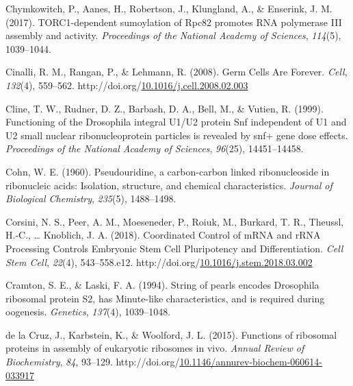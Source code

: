 \documentclass[12pt,oneside]{reedthesis}
\newlength{\cslhangindent}
\newenvironment{CSLReferences}[2] %
 {%
  \setlength{\parindent}{0pt}
  \ifodd #1 \everypar{\setlength{\hangindent}{\cslhangindent}}\ignorespaces\fi
  \ifnum #2 > 0
  \setlength{\parskip}{#2\baselineskip}
  \fi
 }%
 {}
\begin{document}
\begin{CSLReferences}{1}{0}
\leavevmode{}%
Chymkowitch, P., Aanes, H., Robertson, J., Klungland, A., \& Enserink, J. M. (2017). {TORC1}-dependent sumoylation of {Rpc82} promotes {RNA} polymerase {III} assembly and activity. \emph{Proceedings of the National Academy of Sciences}, \emph{114}(5), 1039--1044.

\leavevmode{}%
Cinalli, R. M., Rangan, P., \& Lehmann, R. (2008). Germ {Cells Are Forever}. \emph{Cell}, \emph{132}(4), 559--562. http://doi.org/\href{https://doi.org/10.1016/j.cell.2008.02.003}{10.1016/j.cell.2008.02.003}

\leavevmode{}%
Cline, T. W., Rudner, D. Z., Barbash, D. A., Bell, M., \& Vutien, R. (1999). Functioning of the {Drosophila} integral {U1}/{U2} protein {Snf} independent of {U1} and {U2} small nuclear ribonucleoprotein particles is revealed by snf+ gene dose effects. \emph{Proceedings of the National Academy of Sciences}, \emph{96}(25), 14451--14458.

\leavevmode{}%
Cohn, W. E. (1960). Pseudouridine, a carbon-carbon linked ribonucleoside in ribonucleic acids: Isolation, structure, and chemical characteristics. \emph{Journal of Biological Chemistry}, \emph{235}(5), 1488--1498.

\leavevmode{}%
Corsini, N. S., Peer, A. M., Moeseneder, P., Roiuk, M., Burkard, T. R., Theussl, H.-C., \ldots{} Knoblich, J. A. (2018). Coordinated {Control} of {mRNA} and {rRNA Processing Controls Embryonic Stem Cell Pluripotency} and {Differentiation}. \emph{Cell Stem Cell}, \emph{22}(4), 543--558.e12. http://doi.org/\href{https://doi.org/10.1016/j.stem.2018.03.002}{10.1016/j.stem.2018.03.002}

\leavevmode{}%
Cramton, S. E., \& Laski, F. A. (1994). String of pearls encodes {Drosophila} ribosomal protein {S2}, has {Minute}-like characteristics, and is required during oogenesis. \emph{Genetics}, \emph{137}(4), 1039--1048.

\leavevmode{}%
de la Cruz, J., Karbstein, K., \& Woolford, J. L. (2015). Functions of ribosomal proteins in assembly of eukaryotic ribosomes in vivo. \emph{Annual Review of Biochemistry}, \emph{84}, 93--129. http://doi.org/\href{https://doi.org/10.1146/annurev-biochem-060614-033917}{10.1146/annurev-biochem-060614-033917}


\end{CSLReferences}
\end{document}
